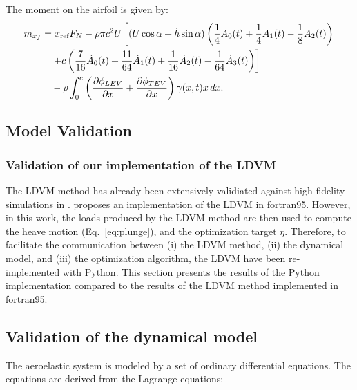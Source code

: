 \documentclass[a4paper,12pt]{article}
\begin{document}
The moment on the airfoil is given by:
\begin{align}
    m_{x_f} &=  x_{\text{ref}} F_N - \rho \pi c^2 U \left[ (U \cos\alpha + \dot{h} \sin\alpha) \left( \frac{1}{4}A_0(t) + \frac{1}{4}A_1(t) - \frac{1}{8}A_2(t) \right) \right. \notag \\
    &\quad \left. + c \left( \frac{7}{16} \dot{A}_0(t) + \frac{11}{64} \dot{A}_1(t) + \frac{1}{16} \dot{A}_2(t) - \frac{1}{64} \dot{A}_3(t) \right) \right] \notag \\
    &\quad - \rho \int_0^c \left( \frac{\partial \phi_{LEV}}{\partial x} + \frac{\partial \phi_{TEV}}{\partial x} \right) \gamma(x, t) x \, dx.
    \label{eq:moment}
\end{align}



\subsection{Model Validation}

\subsubsection{Validation of our implementation of the LDVM}

The LDVM method has already been extensively validiated against high fidelity simulations in \cite{ramesh2014discrete}.  \cite{ramesh2014discrete} proposes an implementation of the LDVM in fortran95. However, in this work, the loads produced by the LDVM method are then used to compute the heave motion (Eq.~\ref{eq:plunge}), and the optimization target $\eta$. Therefore, to facilitate the communication between (i) the LDVM method, (ii) the dynamical model, and (iii) the optimization algorithm, the LDVM have been re-implemented with Python. This section presents the results of the Python implementation compared to the results of the LDVM method implemented in fortran95. 






\subsection{Validation of the dynamical model}

The aeroelastic system is modeled by a set of ordinary differential equations. The equations are derived from the Lagrange equations:
\end{document}
